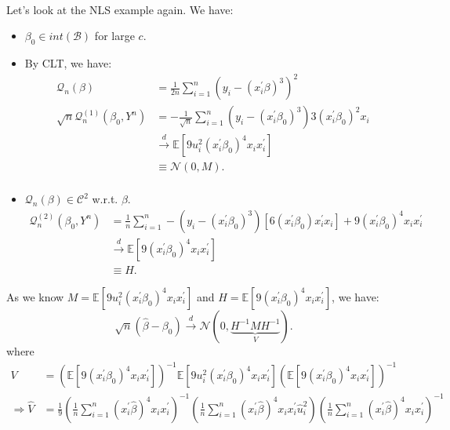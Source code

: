 \begin{eg}
    \
    
    Let's look at the NLS example again. We have:
    \begin{itemize}
        \item $\beta_0 \in int(\mathscr{B})$ for large $c$.
        \item By CLT, we have:
        \begin{align*}
            \mathcal{Q}_n(\beta) &= \frac{1}{2n} \sum_{i=1}^{n} \left(y_i - (x_i^{\prime} \beta)^3\right)^2 \\
            \sqrt{n} \mathcal{Q}_n^{(1)}(\beta_0, Y^n) &= -\frac{1}{\sqrt{n} } \sum_{i=1}^{n} \left(y_i - (x_i^{\prime} \beta_0)^3\right) 3\left(x_i^{\prime} \beta_0\right)^2 x_i \\
            & \overset{d}{\rightarrow} \mathbb{E}\left[9u_i^2(x_i^{\prime} \beta_0)^4 x_i x_i^{\prime} \right] \\
            & \equiv \mathcal{N}(0, M).\\
        \end{align*}
        \item $\mathcal{Q}_n(\beta) \in \mathcal{C}^2$ w.r.t. $\beta$.
        \begin{align*}
            \mathcal{Q}_n^{(2)}(\beta_0, Y^n) &= \frac{1}{n} \sum_{i=1}^{n} -\left(y_i - (x_i^{\prime} \beta_0)^3\right) \left[6(x_i^{\prime} \beta_0) x_i^{\prime} x_i\right] + 9\left(x_i^{\prime} \beta_0\right)^4 x_i x_i^{\prime}  \\
            & \overset{d}{\rightarrow} \mathbb{E}\left[9(x_i^{\prime} \beta_0)^4 x_i x_i^{\prime} \right] \\
            & \equiv H.       
        \end{align*}
    \end{itemize}
    As we know $M = \mathbb{E}\left[9u_i^2(x_i^{\prime} \beta_0)^4 x_i x_i^{\prime} \right]$ and $H = \mathbb{E}\left[9(x_i^{\prime} \beta_0)^4 x_i x_i^{\prime} \right]$,
    we have:
    \[
    \sqrt{n}(\hat{\beta} - \beta_0) \overset{d}{\rightarrow} \mathcal{N}(0, \underset{V}{\underbrace{H^{-1} M H^{-1}}}).
    \]
    where
    \begin{align*}
        V &= \left(\mathbb{E}\left[9(x_i^{\prime} \beta_0)^4 x_i x_i^{\prime} \right]\right)^{-1} \mathbb{E}\left[9u_i^2(x_i^{\prime} \beta_0)^4 x_i x_i^{\prime} \right] \left(\mathbb{E}\left[9(x_i^{\prime} \beta_0)^4 x_i x_i^{\prime} \right]\right)^{-1} \\
        \Rightarrow \hat{V} &= \frac{1}{9}\left(\frac{1}{n} \sum_{i=1}^{n} (x_i^{\prime} \hat{\beta})^4 x_i x_i^{\prime} \right)^{-1} \left(\frac{1}{n} \sum_{i=1}^{n} (x_i^{\prime} \hat{\beta})^4 x_i x_i^{\prime} \hat{u}_i^2 \right) \left(\frac{1}{n} \sum_{i=1}^{n} (x_i^{\prime} \hat{\beta})^4 x_i x_i^{\prime} \right)^{-1} \\

\end{align*}
\end{eg}
